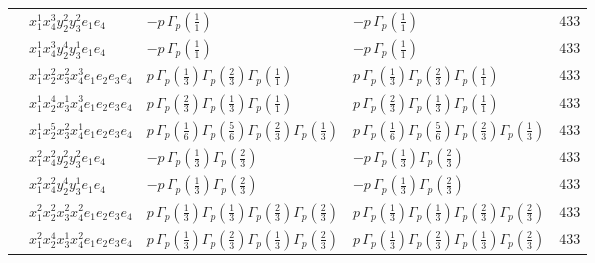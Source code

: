 \documentclass[11pt]{article}
\begin{document}
\begin{table}[ht]
{\begin{tabular}{@{}lllll@{}}
 & $x_{1}^{1} x_{4}^{3} y_{2}^{2} y_{3}^{2} e_{1} e_{4}$ & $- p \, \Gamma_p \left( \frac{1}{1} \right)$ & $- p \, \Gamma_p \left( \frac{1}{1} \right)$ & $433$ \\
 & $x_{1}^{1} x_{4}^{3} y_{2}^{4} y_{3}^{1} e_{1} e_{4}$ & $- p \, \Gamma_p \left( \frac{1}{1} \right)$ & $- p \, \Gamma_p \left( \frac{1}{1} \right)$ & $433$ \\
 & $x_{1}^{1} x_{2}^{2} x_{3}^{2} x_{4}^{3}  e_{1} e_{2} e_{3} e_{4}$ & $p \, \Gamma_p \left( \frac{1}{3} \right) \Gamma_p \left( \frac{2}{3} \right) \Gamma_p \left( \frac{1}{1} \right)$ & $p \, \Gamma_p \left( \frac{1}{3} \right) \Gamma_p \left( \frac{2}{3} \right) \Gamma_p \left( \frac{1}{1} \right)$ & $433$ \\
 & $x_{1}^{1} x_{2}^{4} x_{3}^{1} x_{4}^{3}  e_{1} e_{2} e_{3} e_{4}$ & $p \, \Gamma_p \left( \frac{2}{3} \right) \Gamma_p \left( \frac{1}{3} \right) \Gamma_p \left( \frac{1}{1} \right)$ & $p \, \Gamma_p \left( \frac{2}{3} \right) \Gamma_p \left( \frac{1}{3} \right) \Gamma_p \left( \frac{1}{1} \right)$ & $433$ \\
 & $x_{1}^{1} x_{2}^{5} x_{3}^{2} x_{4}^{1}  e_{1} e_{2} e_{3} e_{4}$ & $p \, \Gamma_p \left( \frac{1}{6} \right) \Gamma_p \left( \frac{5}{6} \right) \Gamma_p \left( \frac{2}{3} \right) \Gamma_p \left( \frac{1}{3} \right)$ & $p \, \Gamma_p \left( \frac{1}{6} \right) \Gamma_p \left( \frac{5}{6} \right) \Gamma_p \left( \frac{2}{3} \right) \Gamma_p \left( \frac{1}{3} \right)$ & $433$ \\
 & $x_{1}^{2} x_{4}^{2} y_{2}^{2} y_{3}^{2} e_{1} e_{4}$ & $- p \, \Gamma_p \left( \frac{1}{3} \right) \Gamma_p \left( \frac{2}{3} \right)$ & $- p \, \Gamma_p \left( \frac{1}{3} \right) \Gamma_p \left( \frac{2}{3} \right)$ & $433$ \\
 & $x_{1}^{2} x_{4}^{2} y_{2}^{4} y_{3}^{1} e_{1} e_{4}$ & $- p \, \Gamma_p \left( \frac{1}{3} \right) \Gamma_p \left( \frac{2}{3} \right)$ & $- p \, \Gamma_p \left( \frac{1}{3} \right) \Gamma_p \left( \frac{2}{3} \right)$ & $433$ \\
 & $x_{1}^{2} x_{2}^{2} x_{3}^{2} x_{4}^{2}  e_{1} e_{2} e_{3} e_{4}$ & $p \, \Gamma_p \left( \frac{1}{3} \right) \Gamma_p \left( \frac{1}{3} \right) \Gamma_p \left( \frac{2}{3} \right) \Gamma_p \left( \frac{2}{3} \right)$ & $p \, \Gamma_p \left( \frac{1}{3} \right) \Gamma_p \left( \frac{1}{3} \right) \Gamma_p \left( \frac{2}{3} \right) \Gamma_p \left( \frac{2}{3} \right)$ & $433$ \\
 & $x_{1}^{2} x_{2}^{4} x_{3}^{1} x_{4}^{2}  e_{1} e_{2} e_{3} e_{4}$ & $p \, \Gamma_p \left( \frac{1}{3} \right) \Gamma_p \left( \frac{2}{3} \right) \Gamma_p \left( \frac{1}{3} \right) \Gamma_p \left( \frac{2}{3} \right)$ & $p \, \Gamma_p \left( \frac{1}{3} \right) \Gamma_p \left( \frac{2}{3} \right) \Gamma_p \left( \frac{1}{3} \right) \Gamma_p \left( \frac{2}{3} \right)$ & $433$ \\

\end{tabular}}
\end{table}
\end{document}
